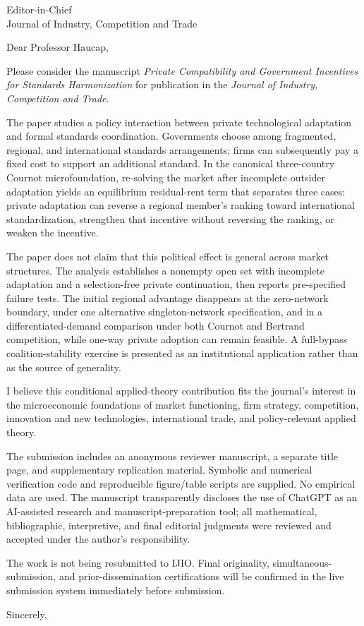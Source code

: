 \documentclass[11pt]{letter}
\begin{document}
\begin{letter}{Editor-in-Chief\\Journal of Industry, Competition and Trade}
\opening{Dear Professor Haucap,}

Please consider the manuscript \emph{Private Compatibility and Government Incentives for Standards Harmonization} for publication in the \emph{Journal of Industry, Competition and Trade}.

The paper studies a policy interaction between private technological adaptation and formal standards coordination. Governments choose among fragmented, regional, and international standards arrangements; firms can subsequently pay a fixed cost to support an additional standard. In the canonical three-country Cournot microfoundation, re-solving the market after incomplete outsider adaptation yields an equilibrium residual-rent term that separates three cases: private adaptation can reverse a regional member's ranking toward international standardization, strengthen that incentive without reversing the ranking, or weaken the incentive.

The paper does not claim that this political effect is general across market structures. The analysis establishes a nonempty open set with incomplete adaptation and a selection-free private continuation, then reports pre-specified failure tests. The initial regional advantage disappears at the zero-network boundary, under one alternative singleton-network specification, and in a differentiated-demand comparison under both Cournot and Bertrand competition, while one-way private adoption can remain feasible. A full-bypass coalition-stability exercise is presented as an institutional application rather than as the source of generality.

I believe this conditional applied-theory contribution fits the journal's interest in the microeconomic foundations of market functioning, firm strategy, competition, innovation and new technologies, international trade, and policy-relevant applied theory.

The submission includes an anonymous reviewer manuscript, a separate title page, and supplementary replication material. Symbolic and numerical verification code and reproducible figure/table scripts are supplied. No empirical data are used. The manuscript transparently discloses the use of ChatGPT as an AI-assisted research and manuscript-preparation tool; all mathematical, bibliographic, interpretive, and final editorial judgments were reviewed and accepted under the author's responsibility.

The work is not being resubmitted to IJIO. Final originality, simultaneous-submission, and prior-dissemination certifications will be confirmed in the live submission system immediately before submission.

\closing{Sincerely,}
\end{letter}
\end{document}
